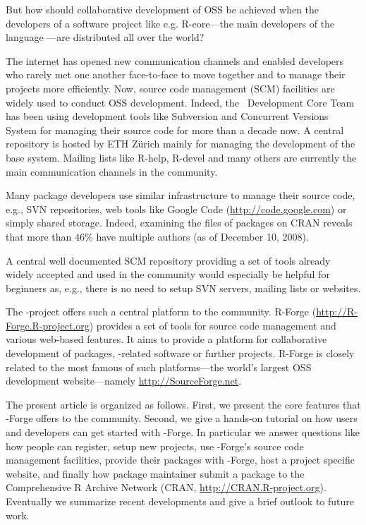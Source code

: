 But how should collaborative development of OSS be achieved when the
developers of a software project like e.g. R-core---the main
developers of the language \R{}---are distributed all over the world?

The internet has opened new communication channels and enabled developers
who rarely met one another face-to-face to move together and to manage
their projects more efficiently. Now, source code management (SCM)
facilities are widely used to conduct OSS development. Indeed, the
\R{}~Development Core Team has been using  
development tools like Subversion \citep[SVN,
see][]{forge:Pilato+Collins-Sussman+Fitzpatrick:2004} and Concurrent
Versions System \citep[CVS, see][]{forge:Cederqvist:2006} 
for managing their source code for more than a decade now.  
A central repository is hosted by ETH Z\"urich mainly for
managing the development of the base \R{} system. Mailing lists like
R-help, R-devel and many others are currently the main communication
channels in  the \R{} community.

Many \R{} package developers use similar infrastructure to manage their
source code, e.g., SVN repositories, web tools like Google Code
(\url{http://code.google.com}) or simply shared storage. Indeed,
examining the  files of packages on CRAN 
reveals that more than $46\%$ have multiple 
authors (as of December 10, 2008). 

A central well documented SCM repository providing a set of tools already
widely accepted and used in the \R{} community would especially be
helpful for beginners as, e.g., there is no need to setup
SVN servers, mailing lists or websites. 

The \R{}-project offers such a central platform to the \R{}
community. R-Forge (\url{http://R-Forge.R-project.org}) provides a set
of tools for source code management and various web-based
features. It aims to provide a platform for collaborative development of
\R{} packages, \R{}-related software or further projects. R-Forge is
closely related to the most famous of such platforms---the 
world's largest OSS development website---namely
\url{http://SourceForge.net}.

The present article is organized as follows. First, we present the core
features that \R{}-Forge offers to the \R{} community. Second, we
give a hands-on tutorial on how users and developers can get started with 
\R{}-Forge. In particular we answer questions like how people
can register, setup new projects, use \R{}-Forge's source code
management facilities, provide their  
packages with \R{}-Forge, host a project specific website, and
finally how package maintainer submit a package to the Comprehensive R
Archive Network (CRAN, \url{http://CRAN.R-project.org}).
Eventually we summarize recent developments and give a brief outlook
to future work.


